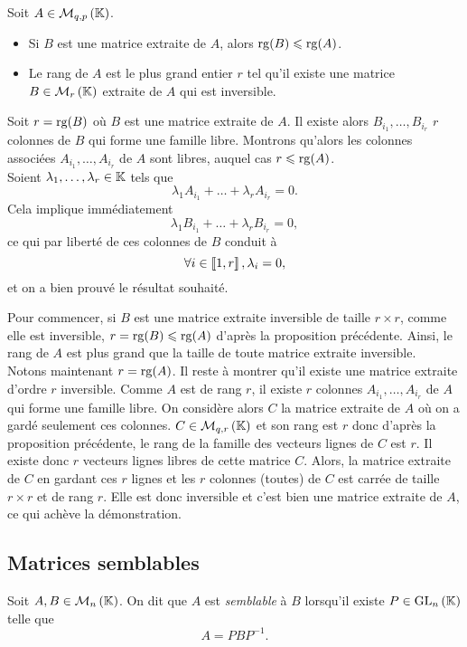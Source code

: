 \documentclass{magnolia}
\begin{document}
\begin{proposition}
Soit $A\in\mathcal{M}_{q,p}\left(\mathbb{K}\right)$.
\begin{itemize}
\item Si $B$ est une matrice extraite de $A$, alors $\operatorname{rg}(B)\leqslant\operatorname{rg}(A)$.
\item Le rang de $A$ est le plus grand entier $r$ tel qu'il existe une matrice $B\in\mathcal{M}_{r}\left(\mathbb{K}\right)$ extraite de $A$ qui est inversible.
\end{itemize}
\end{proposition}

\begin{preuve}
Soit $r=\operatorname{rg}(B)$ où $B$ est une matrice extraite de $A$. Il existe alors $B_{i_1},\ldots,B_{i_r}$ $r$ colonnes de $B$ qui forme une famille libre. Montrons qu'alors les colonnes associées $A_{i_1},\ldots,A_{i_r}$ de $A$ sont libres, auquel cas $r\leqslant \operatorname{rg}(A)$.\\
Soient $\lambda_1,\ldots, \lambda_r \in \mathbb{K}$ tels que $$\lambda_1A_{i_1}+\ldots+\lambda_rA_{i_r}=0.$$ Cela implique immédiatement $$\lambda_1B_{i_1}+\ldots+\lambda_rB_{i_r}=0,$$ ce qui par liberté de ces colonnes de $B$ conduit à $$\forall i \in \left\llbracket 1,r\right\rrbracket, \lambda_i=0,$$ et on a bien prouvé le résultat souhaité.
\end{preuve}

\begin{preuve}
Pour commencer, si $B$ est une matrice extraite inversible de taille $r\times r$, comme elle est inversible, $r=\operatorname{rg}(B)\leqslant \operatorname{rg}(A)$ d'après la proposition précédente. Ainsi, le rang de $A$ est plus grand que la taille de toute matrice extraite inversible. \\
Notons maintenant $r=\operatorname{rg}(A)$. Il reste à montrer qu'il existe une matrice extraite d'ordre $r$ inversible. Comme $A$ est de rang $r$, il existe $r$ colonnes $A_{i_1},\ldots,A_{i_r}$ de $A$ qui forme une famille libre. On considère alors $C$ la matrice extraite de $A$ où on a gardé seulement ces colonnes. $C\in \mathcal{M}_{q,r}\left(\mathbb{K}\right)$ et son rang est $r$ donc d'après la proposition précédente, le rang de la famille des vecteurs lignes de $C$ est $r$. Il existe donc $r$ vecteurs lignes libres de cette matrice $C$. Alors, la matrice extraite de $C$ en gardant ces $r$ lignes et les $r$ colonnes (toutes) de $C$ est carrée de taille $r\times r$ et de rang $r$. Elle est donc inversible et c'est bien une matrice extraite de $A$, ce qui achève la démonstration.
\end{preuve}


\subsection{Matrices semblables}
\begin{definition}[utile=-3]
Soit $A,B\in\mathcal{M}_{n}\left(\mathbb{K}\right)$. On dit que $A$ est \emph{semblable} à $B$ lorsqu'il existe
$P\in{\rm GL}_{n}\left(\mathbb{K}\right)$ telle que
\[A=PBP^{-1}.\]
\end{definition}
\end{document}
